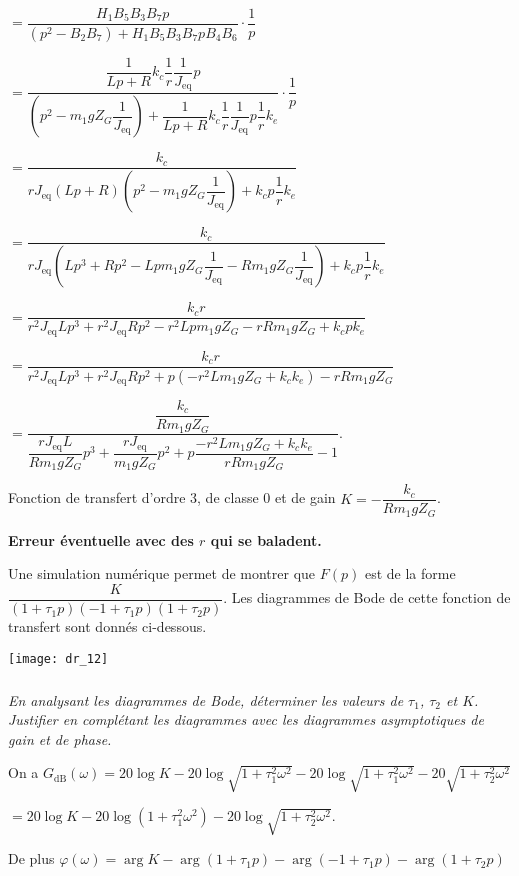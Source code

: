 \begin{multicols}{2}
\begin{corrige}
$=\dfrac{H_1B_5B_3 B_7 p}{\left(p^2-B_2B_7 \right)+H_1B_5B_3 B_7 pB_4 B_6} \cdot\dfrac{1}{p}$

$=\dfrac{\dfrac{1}{Lp + R}k_c\dfrac{1}{r} \dfrac{1}{J_{\text{eq}}} p}{\left(p^2-m_1gZ_G\dfrac{1}{J_{\text{eq}}} \right)+\dfrac{1}{Lp + R}k_c\dfrac{1}{r} \dfrac{1}{J_{\text{eq}}} p\dfrac{1}{r} k_e} \cdot\dfrac{1}{p}$

$=\dfrac{k_c }{ r J_{\text{eq}} \left(Lp + R\right) \left(p^2-m_1gZ_G\dfrac{1}{J_{\text{eq}}} \right)+k_c p\dfrac{1}{r} k_e} $


$=\dfrac{k_c }{ r J_{\text{eq}}  \left(Lp^3 + Rp^2-Lpm_1gZ_G\dfrac{1}{J_{\text{eq}}} - Rm_1gZ_G\dfrac{1}{J_{\text{eq}}} \right)+k_c p\dfrac{1}{r} k_e} $

$=\dfrac{k_c r}{   r^2 J_{\text{eq}}Lp^3 + r^2 J_{\text{eq}}Rp^2-r^2 Lpm_1gZ_G -r  Rm_1gZ_G +k_c p k_e} $

$=\dfrac{k_c r}{   r^2 J_{\text{eq}}Lp^3 + r^2 J_{\text{eq}}Rp^2+p\left(-r^2 Lm_1gZ_G  +k_c  k_e\right)-r  Rm_1gZ_G} $

$=\dfrac{\dfrac{k_c }{ Rm_1gZ_G}}{   \dfrac{r J_{\text{eq}}L}{ Rm_1gZ_G}p^3 + \dfrac{r J_{\text{eq}}}{  m_1gZ_G}p^2+p\dfrac{-r^2 Lm_1gZ_G  +k_c  k_e}{r  Rm_1gZ_G}-1} $.

Fonction de transfert d'ordre 3, de classe 0 et de gain $K=-\dfrac{k_c }{ Rm_1gZ_G}$.

\textbf{Erreur éventuelle avec des $r$ qui se baladent.}
\end{corrige}
\else
\fi

\ifprof
\else
Une simulation numérique permet de montrer que $F(p)$ est de la forme $\dfrac{K}{(1+ \tau_1p)(-1+ \tau_1p)(1+ \tau_2p)}$. Les diagrammes de Bode de cette fonction de transfert sont donnés ci-dessous.

\begin{center}
\texttt{[image: dr\_12]}
\end{center}
\fi


\subparagraph{} \textit{En analysant les diagrammes de Bode, déterminer les valeurs de $\tau_1$, $\tau_2$ et $K$. Justifier en complétant les diagrammes avec les diagrammes asymptotiques de
gain et de phase.}
\ifprof
\begin{corrige}
On a $G_{\text{dB}}(\omega)=20\log K - 20\log \sqrt{1+\tau_1^2\omega^2} - 20\log \sqrt{1+\tau_1^2\omega^2}-20\sqrt{1+\tau_2^2\omega^2}$ 

$=20\log K - 20\log \left(1+\tau_1^2\omega^2 \right)-20\log\sqrt{1+\tau_2^2\omega^2}$.


De plus $\varphi\left(\omega\right)=\arg K - \arg \left( 1+ \tau_1p\right)- \arg \left( -1+ \tau_1p\right)- \arg \left( 1+ \tau_2p\right)$ 


\end{corrige}
\end{multicols}

